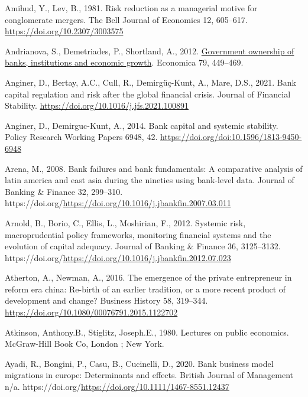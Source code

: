 \documentclass[
  12pt,
  a4paper,
]{scrreprt}
\newlength{\cslhangindent}
\newenvironment{CSLReferences}[2] %
 {\begin{list}{}{%
  \setlength{\itemindent}{0pt}
  \setlength{\leftmargin}{0pt}
  \setlength{\parsep}{0pt}
  \ifodd #1
   \setlength{\leftmargin}{\cslhangindent}
   \setlength{\itemindent}{-1\cslhangindent}
  \fi
  \setlength{\itemsep}{#2\baselineskip}}}
 {\end{list}}
\begin{document}
{{{{\begin{CSLReferences}{1}{0}
Amihud, Y., Lev, B., 1981. Risk reduction as a managerial motive for
conglomerate mergers. The Bell Journal of Economics 12, 605--617.
\url{https://doi.org/10.2307/3003575}

Andrianova, S., Demetriades, P., Shortland, A., 2012.
\href{http://www.jstor.org/stable/23274805}{Government ownership of
banks, institutions and economic growth}. Economica 79, 449--469.

Anginer, D., Bertay, A.C., Cull, R., Demirgüç-Kunt, A., Mare, D.S.,
2021. Bank capital regulation and risk after the global financial
crisis. Journal of Financial Stability.
\url{https://doi.org/10.1016/j.jfs.2021.100891}

Anginer, D., Demirguc-Kunt, A., 2014. Bank capital and systemic
stability. Policy Research Working Papers 6948, 42.
\url{https://doi.org/doi:10.1596/1813-9450-6948}

Arena, M., 2008. Bank failures and bank fundamentals: A comparative
analysis of latin america and east asia during the nineties using
bank-level data. Journal of Banking \& Finance 32, 299--310.
https://doi.org/\url{https://doi.org/10.1016/j.jbankfin.2007.03.011}

Arnold, B., Borio, C., Ellis, L., Moshirian, F., 2012. Systemic risk,
macroprudential policy frameworks, monitoring financial systems and the
evolution of capital adequacy. Journal of Banking \& Finance 36,
3125--3132.
https://doi.org/\url{https://doi.org/10.1016/j.jbankfin.2012.07.023}

Atherton, A., Newman, A., 2016. The emergence of the private
entrepreneur in reform era china: Re-birth of an earlier tradition, or a
more recent product of development and change? Business History 58,
319--344. \url{https://doi.org/10.1080/00076791.2015.1122702}

Atkinson, Anthony.B., Stiglitz, Joseph.E., 1980. Lectures on public
economics. McGraw-Hill Book Co, London ; New York.

Ayadi, R., Bongini, P., Casu, B., Cucinelli, D., 2020. Bank business
model migrations in europe: Determinants and effects. British Journal of
Management n/a.
https://doi.org/\url{https://doi.org/10.1111/1467-8551.12437}


\end{CSLReferences}}}}}
\end{document}
